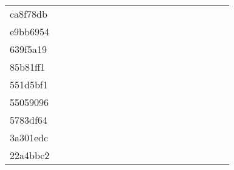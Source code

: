 \begin{table*}[htb]
\begin{tabular}{l|cccccccccccccccccc}
ca8f78db  & \C & \X & \X & \X & \X & \C & \X & \X & \C & \X & \X & \X & \X & \C & \C & \C & \C \\
e9bb6954  & \C & \X & \X & \X & \X & \X & \X & \X & \X & \X & \X & \X & \X & \C & \C & \C & \C \\
639f5a19  & \C & \X & \X & \X & \X & \X & \X & \X & \X & \X & \X & \X & \X & \X & \C & \X & \X \\
85b81ff1  & \C & \X & \X & \X & \X & \X & \X & \X & \X & \X & \X & \X & \X & \C & \C & \X & \X \\
551d5bf1  & \C & \X & \X & \X & \X & \X & \X & \X & \X & \X & \X & \X & \X & \X & \C & \C & \C \\
55059096  & \C & \X & \X & \X & \X & \C & \C & \C & \X & \X & \X & \X & \X & \C & \C & \C & \X \\
5783df64  & \C & \X & \X & \X & \X & \X & \C & \C & \C & \C & \C & \C & \C & \C & \C & \C & \C \\
3a301edc  & \C & \X & \X & \X & \X & \X & \X & \X & \X & \X & \X & \X & \X & \C & \C & \X & \X \\
22a4bbc2  & \C & \X & \X & \X & \X & \X & \X & \X & \X & \X & \X & \X & \X & \C & \C & \X & \C \\
\bottomrule
\end{tabular}
\label{tab:arc400eval1_5}
\end{table*}

